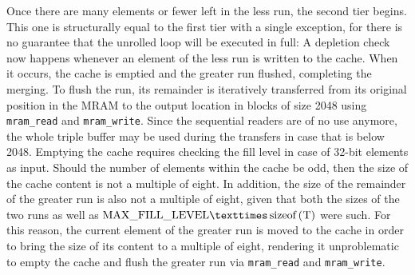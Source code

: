Once there are \unrollfactor{} many elements or fewer left in the less run, the second tier begins.
This one is structurally equal to the first tier with a single exception, for there is no guarantee that the unrolled loop will be executed in full:
A depletion check now happens whenever an element of the less run is written to the cache.
When it occurs, the cache is emptied and the greater run flushed, completing the merging.
To flush the run, its remainder is iteratively transferred from its original position in the \ac{MRAM} to the output location in blocks of size \qty{2048}{\byte} using \lstinline|mram_read| and \lstinline|mram_write|.
Since the sequential readers are of no use anymore, the whole triple buffer may be used during the transfers in case that \cachesize{} is below 2048.
Emptying the cache requires checking the fill level in case of 32-bit elements as input.
Should the number of elements within the cache be odd, then the size of the cache content is not a multiple of eight.
In addition, the size of the remainder of the greater run is also not a multiple of eight, given that both the sizes of the two runs as well as \(\unrolledcachelength{} × \text{\lstinline[keywords={}]|sizeof(T)|}\) were such.
For this reason, the current element of the greater run is moved to the cache in order to bring the size of its content to a multiple of eight, rendering it unproblematic to empty the cache and flush the greater run via \lstinline|mram_read| and \lstinline|mram_write|.

\SetArgSty{}
\SetFuncArgSty{}




